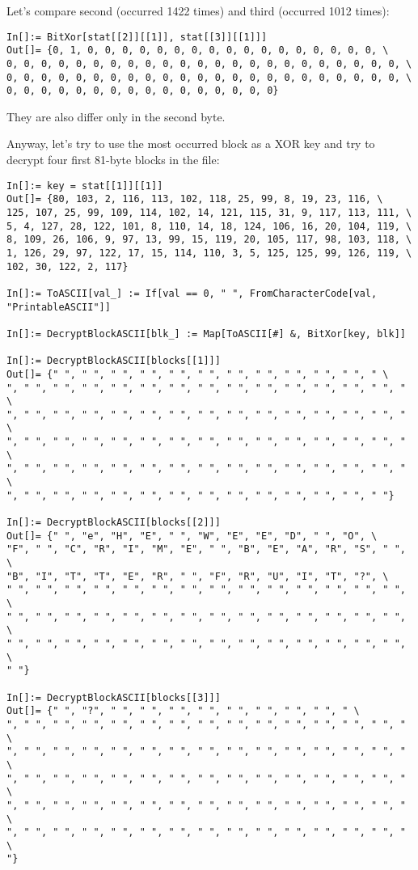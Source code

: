 Let's compare second (occurred 1422 times) and third (occurred 1012 times):

\begin{lstlisting}
In[]:= BitXor[stat[[2]][[1]], stat[[3]][[1]]]
Out[]= {0, 1, 0, 0, 0, 0, 0, 0, 0, 0, 0, 0, 0, 0, 0, 0, 0, 0, 0, \
0, 0, 0, 0, 0, 0, 0, 0, 0, 0, 0, 0, 0, 0, 0, 0, 0, 0, 0, 0, 0, 0, 0, \
0, 0, 0, 0, 0, 0, 0, 0, 0, 0, 0, 0, 0, 0, 0, 0, 0, 0, 0, 0, 0, 0, 0, \
0, 0, 0, 0, 0, 0, 0, 0, 0, 0, 0, 0, 0, 0, 0, 0}
\end{lstlisting}

They are also differ only in the second byte.

Anyway, let's try to use the most occurred block as a XOR key and try to decrypt four first 81-byte blocks in the file:

\begin{lstlisting}
In[]:= key = stat[[1]][[1]]
Out[]= {80, 103, 2, 116, 113, 102, 118, 25, 99, 8, 19, 23, 116, \
125, 107, 25, 99, 109, 114, 102, 14, 121, 115, 31, 9, 117, 113, 111, \
5, 4, 127, 28, 122, 101, 8, 110, 14, 18, 124, 106, 16, 20, 104, 119, \
8, 109, 26, 106, 9, 97, 13, 99, 15, 119, 20, 105, 117, 98, 103, 118, \
1, 126, 29, 97, 122, 17, 15, 114, 110, 3, 5, 125, 125, 99, 126, 119, \
102, 30, 122, 2, 117}

In[]:= ToASCII[val_] := If[val == 0, " ", FromCharacterCode[val, "PrintableASCII"]]

In[]:= DecryptBlockASCII[blk_] := Map[ToASCII[#] &, BitXor[key, blk]]

In[]:= DecryptBlockASCII[blocks[[1]]]
Out[]= {" ", " ", " ", " ", " ", " ", " ", " ", " ", " ", " ", " \
", " ", " ", " ", " ", " ", " ", " ", " ", " ", " ", " ", " ", " ", " \
", " ", " ", " ", " ", " ", " ", " ", " ", " ", " ", " ", " ", " ", " \
", " ", " ", " ", " ", " ", " ", " ", " ", " ", " ", " ", " ", " ", " \
", " ", " ", " ", " ", " ", " ", " ", " ", " ", " ", " ", " ", " ", " \
", " ", " ", " ", " ", " ", " ", " ", " ", " ", " ", " ", " ", " "}

In[]:= DecryptBlockASCII[blocks[[2]]]
Out[]= {" ", "e", "H", "E", " ", "W", "E", "E", "D", " ", "O", \
"F", " ", "C", "R", "I", "M", "E", " ", "B", "E", "A", "R", "S", " ", \
"B", "I", "T", "T", "E", "R", " ", "F", "R", "U", "I", "T", "?", \
" ", " ", " ", " ", " ", " ", " ", " ", " ", " ", " ", " ", " ", " ", \
" ", " ", " ", " ", " ", " ", " ", " ", " ", " ", " ", " ", " ", " ", \
" ", " ", " ", " ", " ", " ", " ", " ", " ", " ", " ", " ", " ", " ", \
" "}

In[]:= DecryptBlockASCII[blocks[[3]]]
Out[]= {" ", "?", " ", " ", " ", " ", " ", " ", " ", " ", " \
", " ", " ", " ", " ", " ", " ", " ", " ", " ", " ", " ", " ", " ", " \
", " ", " ", " ", " ", " ", " ", " ", " ", " ", " ", " ", " ", " ", " \
", " ", " ", " ", " ", " ", " ", " ", " ", " ", " ", " ", " ", " ", " \
", " ", " ", " ", " ", " ", " ", " ", " ", " ", " ", " ", " ", " ", " \
", " ", " ", " ", " ", " ", " ", " ", " ", " ", " ", " ", " ", " ", " \
"}


\end{lstlisting}
